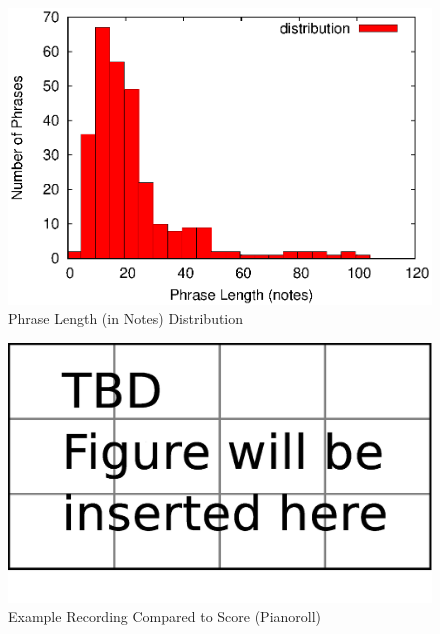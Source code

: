 \begin{figure}[tp]
   \begin{center}
      \includegraphics[width=\textwidth]{fig/phrlength}

   \end{center}
   \caption{Phrase Length (in Notes) Distribution}
   \label{fig:phrlength}
\end{figure}






\begin{figure}[tp]
   \begin{center}
      \includegraphics[width=\textwidth]{fig/TBDFigure}

   \end{center}
   \caption{Example Recording Compared to Score (Pianoroll)}
   \label{fig:exprecording}
\end{figure}

